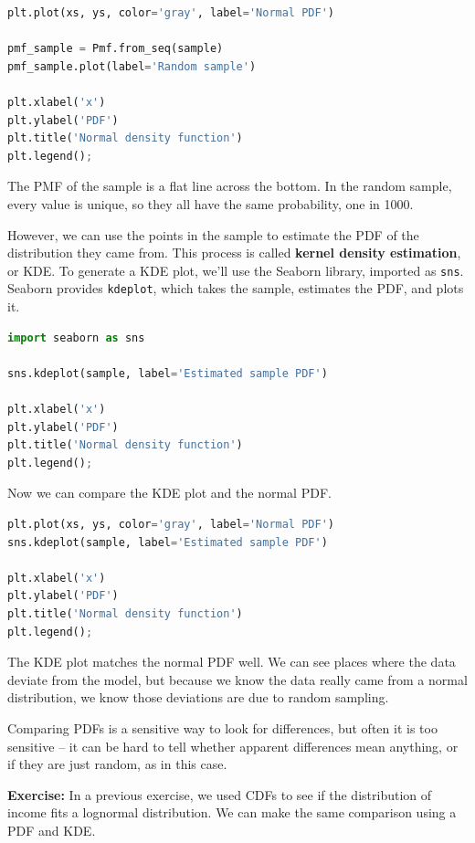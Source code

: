\documentclass[
]{book}
\newcommand{\passthrough}[1]{#1}
\begin{document}
\begin{lstlisting}[language=Python]
plt.plot(xs, ys, color='gray', label='Normal PDF')

pmf_sample = Pmf.from_seq(sample)
pmf_sample.plot(label='Random sample')

plt.xlabel('x')
plt.ylabel('PDF')
plt.title('Normal density function')
plt.legend();
\end{lstlisting}

The PMF of the sample is a flat line across the bottom. In the random
sample, every value is unique, so they all have the same probability,
one in 1000.

However, we can use the points in the sample to estimate the PDF of the
distribution they came from. This process is called \textbf{kernel
density estimation}, or KDE. To generate a KDE plot, we'll use the
Seaborn library, imported as \passthrough{\lstinline!sns!}. Seaborn
provides \passthrough{\lstinline!kdeplot!}, which takes the sample,
estimates the PDF, and plots it.

\begin{lstlisting}[language=Python]
import seaborn as sns

sns.kdeplot(sample, label='Estimated sample PDF')

plt.xlabel('x')
plt.ylabel('PDF')
plt.title('Normal density function')
plt.legend();
\end{lstlisting}

Now we can compare the KDE plot and the normal PDF.

\begin{lstlisting}[language=Python]
plt.plot(xs, ys, color='gray', label='Normal PDF')
sns.kdeplot(sample, label='Estimated sample PDF')

plt.xlabel('x')
plt.ylabel('PDF')
plt.title('Normal density function')
plt.legend();
\end{lstlisting}

The KDE plot matches the normal PDF well. We can see places where the
data deviate from the model, but because we know the data really came
from a normal distribution, we know those deviations are due to random
sampling.

Comparing PDFs is a sensitive way to look for differences, but often it
is too sensitive -- it can be hard to tell whether apparent differences
mean anything, or if they are just random, as in this case.

\textbf{Exercise:} In a previous exercise, we used CDFs to see if the
distribution of income fits a lognormal distribution. We can make the
same comparison using a PDF and KDE.
\end{document}
